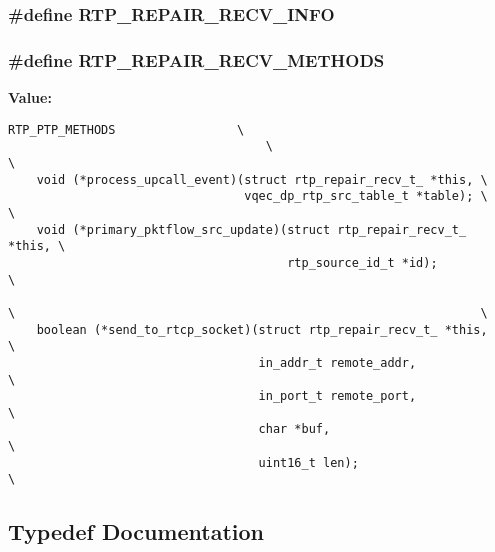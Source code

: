 \subsubsection{\setlength{\rightskip}{0pt plus 5cm}\#define RTP\_\-REPAIR\_\-RECV\_\-INFO}\label{rtp__repair__recv_8h_d33a588855ee03cd04426148cde38020}


\subsubsection{\setlength{\rightskip}{0pt plus 5cm}\#define RTP\_\-REPAIR\_\-RECV\_\-METHODS}\label{rtp__repair__recv_8h_16ed17642aff377c7e53af7fc5fdea0a}


\textbf{Value:}

\begin{Code}\begin{verbatim}RTP_PTP_METHODS                 \
                                    \                                                         \
    void (*process_upcall_event)(struct rtp_repair_recv_t_ *this, \
                                 vqec_dp_rtp_src_table_t *table); \                                                           \
    void (*primary_pktflow_src_update)(struct rtp_repair_recv_t_ *this, \
                                       rtp_source_id_t *id);            \
                                                                        \                                                                 \
    boolean (*send_to_rtcp_socket)(struct rtp_repair_recv_t_ *this,     \
                                   in_addr_t remote_addr,               \
                                   in_port_t remote_port,               \
                                   char *buf,                           \
                                   uint16_t len);                       \
\end{verbatim}\end{Code}


\subsection{Typedef Documentation}
